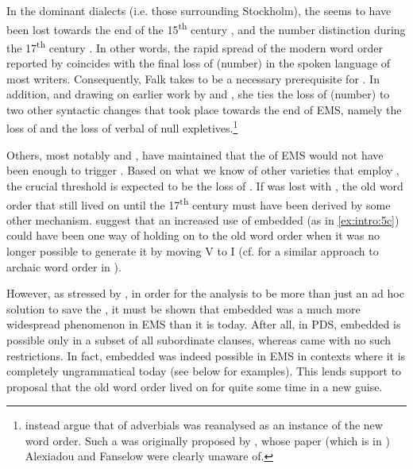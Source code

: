 \documentclass[output=paper]{langscibook}
\begin{document}
In the dominant  dialects (i.e. those surrounding Stockholm), the  seems to have been lost towards the end of the 15\textsuperscript{th} century \citep{Neuman1925}, and the number distinction during the 17\textsuperscript{th} century \citep{Larsson1988}. In other words, the rapid spread of the modern word order reported by \citet{Falk1993} coincides with the final loss of (number)  in the spoken language of most  writers. Consequently, Falk takes  to be a necessary prerequisite for  . In addition, and drawing on earlier work by \citet{Platzack1985} and \citet{PlatzackHolmberg1989}, she ties the loss of (number)  to two other syntactic changes that took place towards the end of EMS, namely the loss of  and the loss of verbal  of null expletives.\footnote{\citet{AlexiadouFanselow2002} instead argue that  of adverbials was reanalysed as an instance of the new word order. Such a  was originally proposed by \citet{Pettersson1988}, whose paper (which is in ) Alexiadou and Fanselow were clearly unaware of.} 



Others, most notably \citet{Rohrbacher1999} and \citet{KoenemanZeijlstra2014}, have maintained that the  of EMS would not have been enough to trigger . Based on what we know of other varieties that employ , the crucial threshold is expected to be the loss of . If  was lost with , the old word order that still lived on until the 17\textsuperscript{th} century must have been derived by some other mechanism. \citet{KoenemanZeijlstra2014} suggest that an increased use of embedded  (as in \ref{ex:intro:5c}) could have been one way of holding on to the old word order when it was no longer possible to generate it by moving V to I (cf. \citealt{HeycockEtAl2010} for a similar approach to archaic word order in ).



However, as stressed by \citet{Gartner2019}, in order for the  analysis to be more than just an ad hoc solution to save the , it must be shown that embedded  was a much more widespread phenomenon in EMS than it is today. After all, in PDS, embedded  is possible only in a subset of all subordinate clauses, whereas  came with no such restrictions. In fact, embedded  was indeed possible in EMS in contexts where it is completely ungrammatical today (see  below for examples). This lends support to  proposal that the old word order lived on for quite some time in a new guise.
\end{document}
